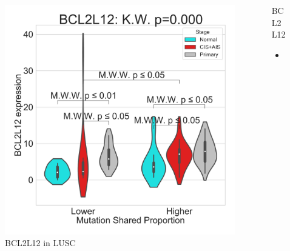 \documentclass{beamer}
\begin{document}
\begin{frame}[allowframebreaks]
                    \begin{columns}
                        \begin{column}{0.4 \textwidth}
                            \begin{figure}
                                \includegraphics[width=\linewidth]{figures/DEG/Violin/STAR.TPM.SQC.MSP-Median.violin/Mutation Shared Proportion_BCL2L12.pdf}
                                \caption{BCL2L12 in LUSC}
                            \end{figure}
                        \end{column}
                        \begin{column}{0.55 \textwidth}
                            \begin{block}{BCL2L12}
                                \begin{itemize}
                                    \item
                                \end{itemize}
                            \end{block}
                        \end{column}
                    \end{columns}


\end{frame}
\end{document}
